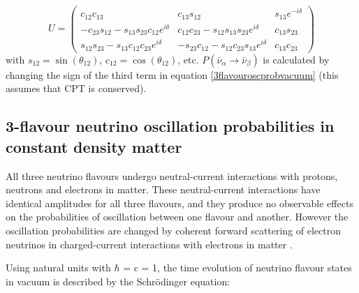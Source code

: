\begin{equation}
U = \left(
\begin{array}{ccc}
c_{12}c_{13} & c_{13}s_{12} & s_{13}e^{-i\delta} \\
-c_{23}s_{12} - s_{13}s_{23}c_{12}e^{i\delta} & c_{12}c_{23} - s_{12}s_{13}s_{23}e^{i\delta} & c_{13}s_{23} \\
s_{12}s_{23} - s_{13}c_{12}c_{23}e^{i\delta} & -s_{23}c_{12} - s_{12}c_{23}s_{13}e^{i\delta} & c_{13}c_{23}
\end{array} \right)
\label{PMNSmatrix}
\end{equation}
with $s_{12} = \sin(\theta_{12})$, $c_{12} = \cos(\theta_{12})$, etc. $P(\bar{\nu}_{\alpha} \rightarrow \bar{\nu}_{\beta})$ 
is calculated by changing the sign of the third term in equation \ref{3flavouroscprobvacuum} (this assumes that CPT is 
conserved).

\subsection{3-flavour neutrino oscillation probabilities in constant density matter}
\label{sec:matterosc}
All three neutrino flavours undergo neutral-current interactions with protons, neutrons and electrons in matter. These 
neutral-current interactions have identical amplitudes for all three flavours, and they produce no observable effects on
the probabilities of oscillation between one flavour and another. However the oscillation probabilities are changed by 
coherent forward scattering of electron neutrinos in charged-current interactions with electrons in matter \cite{kayser2005}.

Using natural units with $\hbar$ = c = 1, the time evolution of neutrino flavour states in vacuum is described by the 
Schr\"odinger equation:

